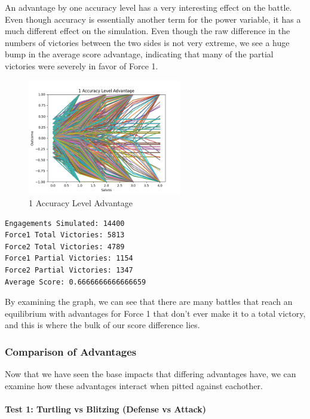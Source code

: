 An advantage by one accuracy level has a very interesting effect on the
battle. Even though accuracy is essentially another term for the power
variable, it has a much different effect on the simulation. Even though
the raw difference in the numbers of victories between the two sides is
not very extreme, we see a huge bump in the average score advantage,
indicating that many of the partial victories were severely in favor of
Force 1.

\begin{figure}
\hypertarget{fig:refname}{%
\centering
\includegraphics[width=0.6\textwidth,height=\textheight]{figures/1AccuracyAdv.png}
\caption{1 Accuracy Level Advantage}\label{fig:refname}
}
\end{figure}

\begin{verbatim}
Engagements Simulated: 14400
Force1 Total Victories: 5813
Force2 Total Victories: 4789
Force1 Partial Victories: 1154
Force2 Partial Victories: 1347
Average Score: 0.6666666666666659
\end{verbatim}

By examining the graph, we can see that there are many battles that
reach an equilibrium with advantages for Force 1 that don't ever make it
to a total victory, and this is where the bulk of our score difference
lies.

\hypertarget{comparison-of-advantages}{%
\subsubsection{Comparison of
Advantages}\label{comparison-of-advantages}}

Now that we have seen the base impacts that differing advantages have,
we can examine how these advantages interact when pitted against
eachother.

\hypertarget{test-1-turtling-vs-blitzing-defense-vs-attack}{%
\paragraph{Test 1: Turtling vs Blitzing (Defense vs
Attack)}\label{test-1-turtling-vs-blitzing-defense-vs-attack}}

